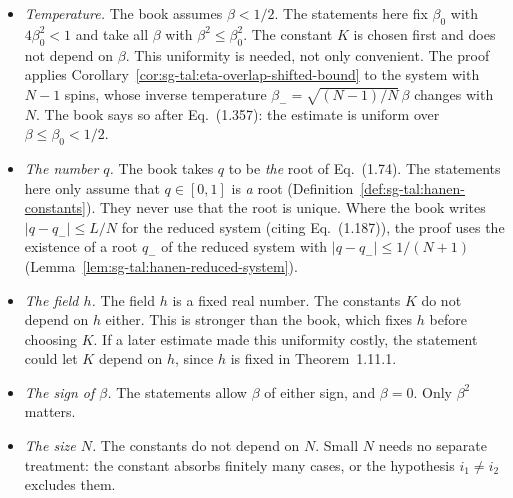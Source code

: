\begin{remark}\label{rem:sg-tal:hanen-standing}
\begin{itemize}
\item \emph{Temperature.} The book assumes $\beta<1/2$. The statements here fix $\beta_0$ with $4\beta_0^2<1$
 and take all $\beta$ with $\beta^2\le\beta_0^2$. The constant $K$ is chosen first and does not depend on $\beta$.
 This uniformity is needed, not only convenient. The proof applies Corollary~\ref{cor:sg-tal:eta-overlap-shifted-bound}
 to the system with $N-1$ spins, whose inverse temperature $\beta_-=\sqrt{(N-1)/N}\,\beta$ changes with $N$.
 The book says so after Eq.~(1.357): the estimate is uniform over $\beta\le\beta_0<1/2$.
\item \emph{The number $q$.} The book takes $q$ to be \emph{the} root of Eq.~(1.74). The statements here only
 assume that $q\in[0,1]$ is \emph{a} root (Definition~\ref{def:sg-tal:hanen-constants}). They never use that the root is unique.
 Where the book writes $|q-q_-|\le L/N$ for the reduced system (citing Eq.~(1.187)), the proof uses the existence of a root $q_-$
 of the reduced system with $|q-q_-|\le 1/(N+1)$ (Lemma~\ref{lem:sg-tal:hanen-reduced-system}).
\item \emph{The field $h$.} The field $h$ is a fixed real number. The constants $K$ do not depend on $h$ either.
 This is stronger than the book, which fixes $h$ before choosing $K$.
 If a later estimate made this uniformity costly, the statement could let $K$ depend on $h$, since $h$ is fixed in Theorem~1.11.1.
\item \emph{The sign of $\beta$.} The statements allow $\beta$ of either sign, and $\beta=0$. Only $\beta^2$ matters.
\item \emph{The size $N$.} The constants do not depend on $N$. Small $N$ needs no separate treatment:
 the constant absorbs finitely many cases, or the hypothesis $i_1\neq i_2$ excludes them.
\end{itemize}
\end{remark}


